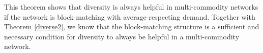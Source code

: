 This theorem shows that diversity is always helpful in multi-commodity networks if the network is block-matching with average-respecting demand. Together with Theorem \ref{diverse2}, we know that the block-matching structure is a sufficient and necessary condition for diversity to always be helpful in a multi-commodity network.
